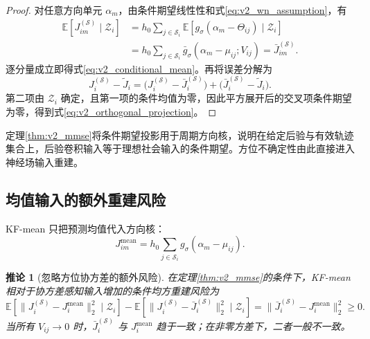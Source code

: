 \documentclass[UTF8,fontset=windows,11pt]{ctexart}
\newtheorem{corollary}[theorem]{推论}
\newcommand{\E}{\mathbb E}
\begin{document}
\begin{proof}
对任意方向单元 $\alpha_m$，由条件期望线性性和式\eqref{eq:v2_wn_assumption}，有
\begin{equation}
 \begin{aligned}
 \E[J_{im}^{(\mathcal S)}\mid\mathcal Z_i]
 &=h_0\sum_{j\in\mathcal S_i}
 \E[g_\sigma(\alpha_m-\Theta_{ij})\mid\mathcal Z_i]\\
 &=h_0\sum_{j\in\mathcal S_i}
 \bar g_\sigma(\alpha_m-\mu_{ij};V_{ij})
 =\bar J_{im}^{(\mathcal S)}.
 \end{aligned}
 \label{eq:v2_component_expectation}
\end{equation}
逐分量成立即得式\eqref{eq:v2_conditional_mean}。再将误差分解为
\begin{equation}
 J_i^{(\mathcal S)}-\widetilde J_i
 =\bigl(J_i^{(\mathcal S)}-\bar J_i^{(\mathcal S)}\bigr)
 +\bigl(\bar J_i^{(\mathcal S)}-\widetilde J_i\bigr).
 \label{eq:v2_error_decomposition}
\end{equation}
第二项由 $\mathcal Z_i$ 确定，且第一项的条件均值为零，因此平方展开后的交叉项条件期望为零，得到式\eqref{eq:v2_orthogonal_projection}。
\end{proof}

定理\ref{thm:v2_mmse}将条件期望投影用于周期方向核，说明在给定后验与有效轨迹集合上，后验卷积输入等于理想社会输入的条件期望。方位不确定性由此直接进入神经场输入重建。

\subsection{均值输入的额外重建风险}

KF-mean 只把预测均值代入方向核：
\begin{equation}
 J_{im}^{\mathrm{mean}}=h_0\sum_{j\in\mathcal S_i}
 g_\sigma(\alpha_m-\mu_{ij}).
 \label{eq:v2_mean_input}
\end{equation}

\begin{corollary}[忽略方位协方差的额外风险]
\label{cor:v2_mean_risk}
在定理\ref{thm:v2_mmse}的条件下，KF-mean 相对于协方差感知输入增加的条件均方重建风险为
\begin{equation}
 \E[\|J_i^{(\mathcal S)}-J_i^{\mathrm{mean}}\|_2^2\mid\mathcal Z_i]
 -\E[\|J_i^{(\mathcal S)}-\bar J_i^{(\mathcal S)}\|_2^2\mid\mathcal Z_i]
 =\|\bar J_i^{(\mathcal S)}-J_i^{\mathrm{mean}}\|_2^2\ge0.
 \label{eq:v2_mean_risk_gap}
\end{equation}
当所有 $V_{ij}\to0$ 时，$\bar J_i^{(\mathcal S)}$ 与 $J_i^{\mathrm{mean}}$ 趋于一致；在非零方差下，二者一般不一致。
\end{corollary}
\end{document}
